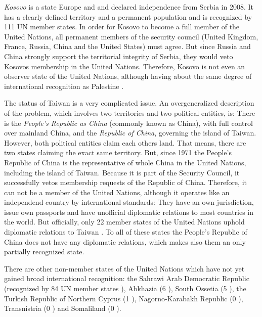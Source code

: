 \emph{Kosovo} is a state Europe and and declared independence from Serbia in 2008. It has a clearly defined territory and a permanent population and is recognized by 111 UN member states. In order for Kosovo to become a full member of the United Nations, all permanent members of the security council (United Kingdom, France, Russia, China and the United States) must agree. But since Russia and China strongly support the territorial integrity of Serbia, they would veto Kosovos membership in the United Nations. Therefore, Kosovo is not even an observer state of the United Nations, although having about the same degree of international recognition as Palestine \cite{KosovoThanksYou}.

The status of Taiwan is a very complicated issue. An overgeneralized description of the problem, which involves two territories and two political entities, is: There is the \emph{People's Republic as China} (commonly known as China), with full control over mainland China, and the \emph{Republic of China}, governing the island of Taiwan. However, both political entities claim each others land. That means, there are two states claiming the exact same territory. But, since 1971 the People's Republic of China is the representative of whole China in the United Nations, including the island of Taiwan. Because it is part of the Security Council, it successfully vetos membership requests of the Republic of China. Therefore, it can not be a member of the United Nations, although it operates like an independend country by international standards: They have an own jurisdiction, issue own passports and have unofficial diplomatic relations to most countries in the world. But officially, only 22 member states of the United Nations uphold diplomatic relations to Taiwan \cite{TaiwanRecognition}. To all of these states the People's Republic of China does not have any diplomatic relations, which makes also them an only partially recognized state.

There are other non-member states of the United Nations which have not yet gained broad international recognition: the Sahrawi Arab Democratic Republic (recognized by 84 UN member states \cite{WesternSaharaRecognition}), Abkhazia (6 \cite{AbkhaziaRecognition}), South Ossetia (5 \cite{SouthOssetiaRecognition}), the Turkish Republic of Northern Cyprus (1 \cite{NorthernCyprusRecognition}), Nagorno-Karabakh Republic (0 \cite{NagornoRecognition}), Transnistria (0 \cite{TransnistriaRecognition}) and Somaliland (0 \cite{SomalilandRecognition}).

